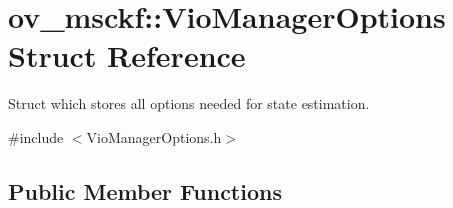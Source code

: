 \hypertarget{structov__msckf_1_1VioManagerOptions}{}\section{ov\+\_\+msckf\+:\+:Vio\+Manager\+Options Struct Reference}
\label{structov__msckf_1_1VioManagerOptions}


Struct which stores all options needed for state estimation.  




{\ttfamily \#include $<$Vio\+Manager\+Options.\+h$>$}

\subsection*{Public Member Functions}
